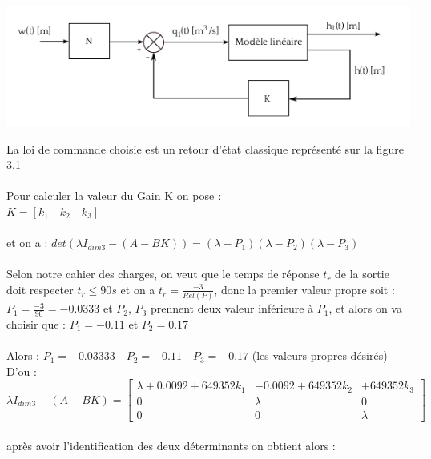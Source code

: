 \begin{center}
\includegraphics[scale=0.7]{fig2.png}
\label{fig2} 
\end{center}

La loi de commande choisie est un retour d'état classique représenté sur la figure 3.1 \\\\


Pour calculer la valeur du Gain K on pose :\\

$K=[k_{1}\quad k_{2} \quad k_{3}]$\\\\
et on a : 
$det(\lambda I_{dim3}-(A-BK))=(\lambda-P_{1})(\lambda-P_{2})(\lambda-P_{3})$\\\\
Selon notre cahier des charges, on veut que le temps de réponse $t_{r}$ de la sortie doit respecter $t_{r} \leq 90s$ et on a $t_{r}=\frac{-3}{Rel(P)}$, donc la premier valeur propre soit : $P_{1}=\frac{-3}{90}=-0.0333$ et $P_{2}$, $P_{3}$ prennent deux valeur inférieure à $P_{1}$, et alors on va choisir que : $P_{1}=-0.11$ et $P_{2}=0.17$\\\\    

Alors : $P_{1}=-0.03333 \quad P_{2}=-0.11 \quad P_{3}=-0.17$ (les valeurs propres désirés)\\

D'ou :\\
$\lambda I_{dim3}-(A-BK)=\begin{bmatrix} 
\lambda+0.0092+649352k_{1} & -0.0092+649352k_{2} & +649352k_{3} \\
0 & \lambda & 0 \\
0 & 0 & \lambda  
\end{bmatrix} $\\\\
 
après avoir l'identification des deux déterminants on obtient alors :\\

